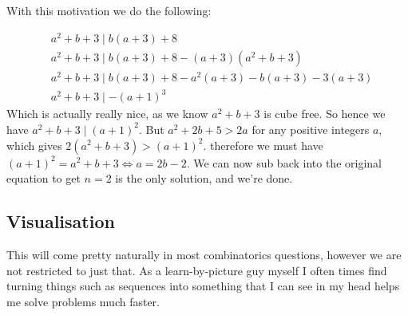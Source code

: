 \documentclass{article}
\theoremstyle{mytheoremstyle}
\theoremstyle{mytheoremstyle}
\theoremstyle{myproblemstyle}
\theoremstyle{myproblemstyle}
\begin{document}
    With this motivation we do the following:

    \begin{align*}
        &a^2 + b + 3 \mid b(a+3) + 8 \\
        &a^2 + b + 3 \mid b(a+3) + 8 - (a+3)(a^2 + b + 3)\\
        &a^2 + b + 3 \mid b(a+3) + 8 - a^2(a+3) - b(a+3) - 3(a+3)\\
        &a^2 + b + 3 \mid -(a+1)^3
    \end{align*}
    Which is actually really nice, as we know $a^2 + b + 3$ is cube free. So hence we have $a^2 + b + 3 \mid (a+1)^2$. But $a^2 + 2b + 5 > 2a$ for any positive integers $a$, which gives $2(a^2 + b + 3) > (a+1)^2$. therefore we must have $(a+1)^2 = a^2 + b + 3 \iff a = 2b - 2$. We can now sub back into the original equation to get $n=2$ is the only solution, and we're done.

    


    \subsection{Visualisation}
    This will come pretty naturally in most combinatorics questions, however we are not restricted to just that. As a learn-by-picture guy myself I often times find turning things such as sequences into something that I can see in my head helps me solve problems much faster.


    
    
\end{document}
